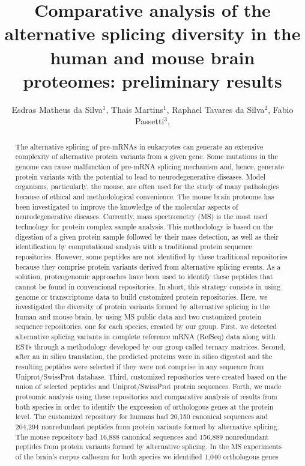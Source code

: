 \documentclass[twoside]{article}
\title{\vspace{-15mm}\fontsize{24pt}{10pt}\selectfont\textbf{ Comparative analysis of the alternative splicing diversity in the human and mouse brain proteomes: preliminary results }} %
\author{ Esdras Matheus da Silva$^{1}$, Thais Martins$^{1}$, Raphael Tavares da Silva$^{2}$, Fabio Passetti$^{3}$, }
\affil{ 1 Oswaldo Cruz Institute

2 Universidade Federal de Minas Gerais

3 FIOCRUZ - IOC

 }
\date{}
\begin{document}
  
  
  \maketitle %
  
  
  \thispagestyle{fancy} %
  
  
  \begin{abstract}
  The alternative splicing of  pre-mRNAs in eukaryotes can generate an extensive complexity of alternative protein variants from a given gene. Some mutations in the genome can cause malfunction of  pre-mRNA splicing mechanism and, hence, generate protein variants with the potential to lead to neurodegenerative diseases. Model organisms, particularly, the mouse, are often used for the study of many pathologies because of ethical and methodological convenience. The mouse brain proteome has been investigated to improve the knowledge of the molecular aspects of neurodegenerative diseases. Currently, mass spectrometry (MS) is the most used technology for protein complex sample analysis. This methodology is based on the digestion of a given protein sample followed by their mass detection, as well as their identification by computational analysis with a traditional protein sequence repositories. However, some peptides are not identified by these traditional repositories because they comprise protein variants derived from alternative splicing events. As a solution, proteogenomic approaches have been used to identify these peptides that cannot be found in convencional repositories. In short, this strategy consists in using genome or transcriptome data to build customized protein repositories. Here, we investigated the diversity of protein variants formed by alternative splicing in the human and mouse brain, by using MS public data and two customized protein sequence repositories, one for each species, created by our group. First, we detected alternative splicing variants in complete reference mRNA (RefSeq) data along with ESTs through a methodology developed by our group called ternary matrices. Second, after an in silico translation, the predicted proteins were in silico digested and the resulting peptides were selected if they were not comprise in any sequence from Uniprot/SwissProt database. Third, customized repositories were created based on the union of selected peptides and Uniprot/SwissProt protein sequences. Forth, we made proteomic analysis using these repositories and comparative analysis of results from both species in order to identify the expression of orthologous genes at the protein level. The customized repository for humans had 20,150 canonical sequences and 204,294 nonredundant peptides from protein variants formed by alternative splicing. The mouse repository had 16,888 canonical sequences and 156,889 nonredundant peptides from protein variants formed by alternative splicing. In the MS experiments of the brain’s corpus callosum for both species we identified 1,040 orthologous genes 
\end{abstract}
\end{document}
